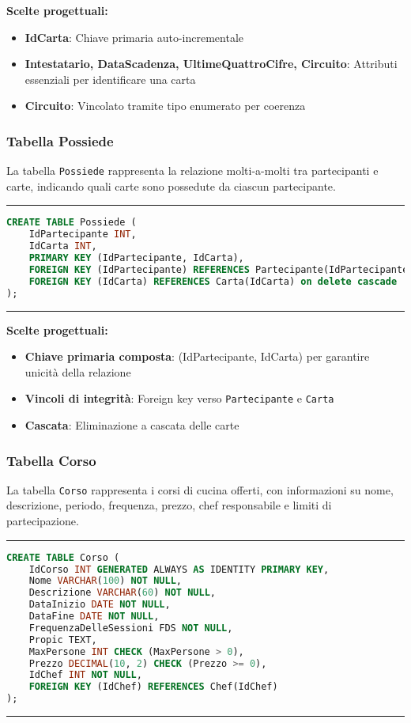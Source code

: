 \textbf{Scelte progettuali:}
\begin{itemize}
    \item \textbf{IdCarta}: Chiave primaria auto-incrementale
    \item \textbf{Intestatario, DataScadenza, UltimeQuattroCifre, Circuito}: Attributi essenziali per identificare una carta
    \item \textbf{Circuito}: Vincolato tramite tipo enumerato per coerenza
\end{itemize}

\subsubsection{Tabella Possiede}

La tabella \texttt{Possiede} rappresenta la relazione molti-a-molti tra partecipanti e carte, indicando quali carte sono possedute da ciascun partecipante.

\noindent\rule{\textwidth}{0.4pt}
\begin{lstlisting}[language=SQL, style=sqlstyle]
CREATE TABLE Possiede (
    IdPartecipante INT,
    IdCarta INT,
    PRIMARY KEY (IdPartecipante, IdCarta),
    FOREIGN KEY (IdPartecipante) REFERENCES Partecipante(IdPartecipante),
    FOREIGN KEY (IdCarta) REFERENCES Carta(IdCarta) on delete cascade 
);
\end{lstlisting}
\noindent\rule{\textwidth}{0.4pt}

\textbf{Scelte progettuali:}
\begin{itemize}
    \item \textbf{Chiave primaria composta}: (IdPartecipante, IdCarta) per garantire unicità della relazione
    \item \textbf{Vincoli di integrità}: Foreign key verso \texttt{Partecipante} e \texttt{Carta}
    \item \textbf{Cascata}: Eliminazione a cascata delle carte
\end{itemize}

\subsubsection{Tabella Corso}

La tabella \texttt{Corso} rappresenta i corsi di cucina offerti, con informazioni su nome, descrizione, periodo, frequenza, prezzo, chef responsabile e limiti di partecipazione.

\noindent\rule{\textwidth}{0.4pt}
\begin{lstlisting}[language=SQL, style=sqlstyle]
CREATE TABLE Corso (
    IdCorso INT GENERATED ALWAYS AS IDENTITY PRIMARY KEY,
    Nome VARCHAR(100) NOT NULL,
    Descrizione VARCHAR(60) NOT NULL,
    DataInizio DATE NOT NULL,
    DataFine DATE NOT NULL,
    FrequenzaDelleSessioni FDS NOT NULL,
    Propic TEXT,
    MaxPersone INT CHECK (MaxPersone > 0),
    Prezzo DECIMAL(10, 2) CHECK (Prezzo >= 0),
    IdChef INT NOT NULL,
    FOREIGN KEY (IdChef) REFERENCES Chef(IdChef)
);
\end{lstlisting}
\noindent\rule{\textwidth}{0.4pt}

